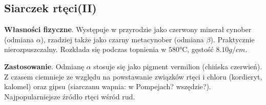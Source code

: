 \subsection{Siarczek rtęci(II) }
\textbf{Własności fizyczne}.
Występuje w przyrodzie jako czerwony minerał cynober (odmiana $\alpha$), rzadziej także jako czarny metacynober (odmiana $\beta$).
Praktycznie nierozpuszczalny.
Rozkłada się podczas topnienia w $580 \si{\celsius}$, gęstość $8.10\si{g \per cm}$.

\textbf{Zastosowanie}.
Odmianę $\alpha$ stosuje się jako pigment vermilion (chińska czerwień).
Z czasem ciemnieje ze względu na powstawanie związków rtęci i chloru (kordieryt, kalomel) oraz gipsu (siarczanu wapnia: w Pompejach? wszędzie?).
Najpopularniejsze źródło rtęci wśród rud.
